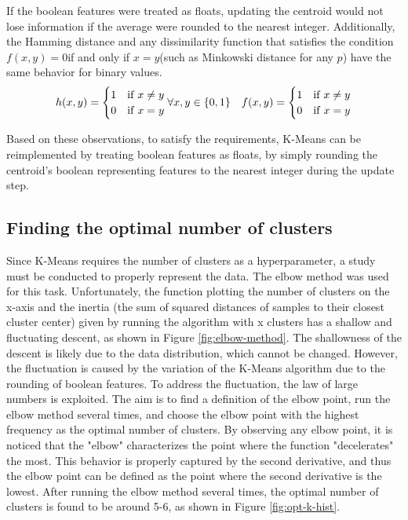 \documentclass[9pt,twocolumn]{article}
\begin{document}
If the boolean features were treated as floats, updating the centroid would not lose information if the average were rounded to the nearest integer.
Additionally, the Hamming distance and any dissimilarity function that satisfies the condition $f(x, y) = 0 $if and only if $x = y$(such as Minkowski distance for any $p$) have the same behavior for binary values.
$$
    h(x, y) = \begin{cases}1&\mathrm{if}\; x \ne y\\ 0&\mathrm{if}\; x=y\end{cases} \\
    \forall x,y\in\{0,1\}\quad f(x, y) = \begin{cases}1&\mathrm{if}\; x \ne y\\ 0&\mathrm{if}\; x=y\end{cases}
$$ 

Based on these observations, to satisfy the requirements, K-Means can be reimplemented by treating boolean features as floats, by simply rounding the centroid's boolean representing features to the nearest integer during the update step. 

\subsection{Finding the optimal number of clusters}
Since K-Means requires the number of clusters as a hyperparameter, a study must be conducted to properly represent the data. The elbow method was used for this task. Unfortunately, the function plotting the number of clusters on the x-axis and the inertia (the sum of squared distances of samples to their closest cluster center) given by running the algorithm with x clusters has a shallow and fluctuating descent, as shown in Figure \ref{fig:elbow-method}. The shallowness of the descent is likely due to the data distribution, which cannot be changed. However, the fluctuation is caused by the variation of the K-Means algorithm due to the rounding of boolean features.
To address the fluctuation, the law of large numbers is exploited. The aim is to find a definition of the elbow point, run the elbow method several times, and choose the elbow point with the highest frequency as the optimal number of clusters.
By observing any elbow point, it is noticed that the "elbow" characterizes the point where the function "decelerates" the most. This behavior is properly captured by the second derivative, and thus the elbow point can be defined as the point where the second derivative is the lowest.
After running the elbow method several times, the optimal number of clusters is found to be around 5-6, as shown in Figure \ref{fig:opt-k-hist}.
\end{document}
